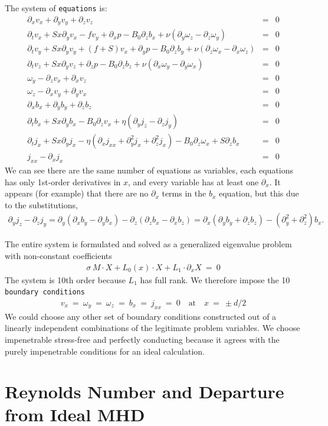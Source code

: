 \documentclass[aps,prl,preprint
,superscriptaddress]{revtex4-1}
\newcommand\Beq{\begin{eqnarray}}
\newcommand\Eeq{\end{eqnarray}}
\newcommand{\pd}[1]{\partial_{#1}}
\begin{document}
The system of \texttt{equations} is:
\Beq\label{u-eq}
\pd{x} v_{x} + \pd{y} v_{y} + \pd{z} v_{z}  &=& 0\\
\pd{t} v_{x} + S x \pd{y} v_{x} - f v_{y} + \pd{x} p - B_{0} \pd{z} b_{x}  + \nu ( \pd{y} \omega_{z} - \pd{z} \omega_{y}) &=& 0\\
\pd{t} v_{y} + S x \pd{y} v_{y} + (f+S) v_{x} + \pd{y} p - B_{0} \pd{z} b_{y} + \nu ( \pd{z} \omega_{x} - \pd{x} \omega_{z})&=& 0\label{v-eq} \\
\pd{t} v_{z} + S x \pd{y} v_{z} + \pd{z} p - B_{0} \pd{z} b_{z} + \nu ( \pd{x} \omega_{y} - \pd{y} \omega_{x})&=& 0 \\
\omega_{y} - \pd{z} v_{x} + \pd{x} v_{z} &=& 0 \\
\omega_{z} - \pd{x} v_{y} + \pd{y} v_{x} &=& 0 \\
\pd{x} b_{x} + \pd{y} b_{y} + \pd{z} b_{z}   &=& 0\\
\pd{t} b_{x} + S x \pd{y} b_{x} - B_{0} \pd{z} v_{x} + \eta ( \pd{y} j_{z} - \pd{z} j_{y})&=& 0\\
\pd{t} j_{x}  + S x \pd{y} j_{x}- \eta( \pd{x}j_{xx} + \pd{y}^{2} j_{x} + \pd{z}^{2} j_{x} )  - B_{0} \pd{z} \omega_{x} + S \pd{z} b_{x} &=& 0\\
j_{xx} - \pd{x} j_{x} &=& 0
\Eeq
We can see there are the same number of equations as variables, each equations has only 1st-order derivatives in $x$, and every variable has at least one $\pd{x}$. It appears (for example) that there are no $\pd{x}$ terms in the $b_{x}$ equation, but this due to the substitutions, 
\Beq
\pd{y} j_{z} - \pd{z} j_{y} =  \pd{y}(\pd{x} b_{y} - \pd{y} b_{x}) - \pd{z}(\pd{z} b_{x} - \pd{x} b_{z})  =  \pd{x}( \pd{y}b_{y} + \pd{z}b_{z}) - (\pd{y}^{2} + \pd{z}^{2})b_{x}.
\Eeq

The entire system is formulated and solved as a generalized eigenvalue problem with non-constant coefficients 
\Beq
\sigma \, M \cdot X + L_{0}(x) \cdot X + L_{1}\cdot \pd{x} X \ = \ 0
\Eeq
The system is 10th order because $L_{1}$ has full rank. We therefore impose the 10 \texttt{boundary conditions} 
\Beq
v_{x} \ = \ \omega_{y} \ = \ \omega_{z} \ = \ b_{x} \ = \ j_{xx} \ = \ 0 \quad \text{at} \quad x \ = \ \pm d/2
\Eeq
We could choose any other set of boundary conditions constructed out of a linearly independent combinations of the legitimate problem variables. We choose impenetrable stress-free and perfectly conducting because it agrees with the purely impenetrable conditions for an ideal calculation.

\section{Reynolds Number and Departure from Ideal MHD}
\label{sec:reyn}
\end{document}
